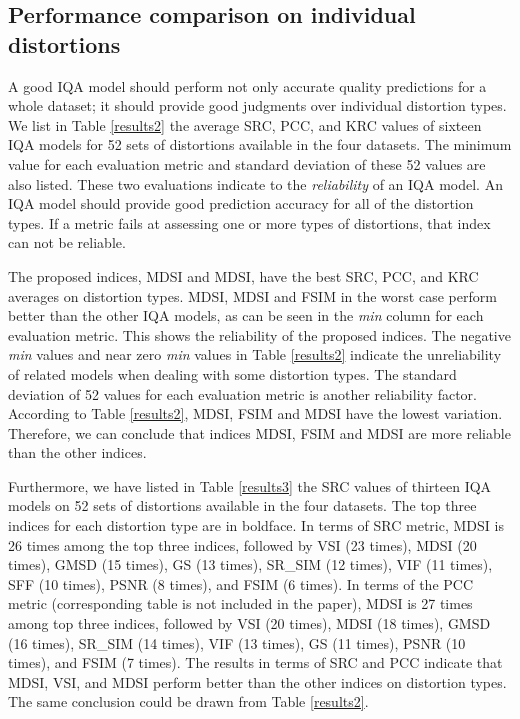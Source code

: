 \subsection{Performance comparison on individual distortions}
\label{individual}      

A good IQA model should perform not only accurate quality predictions for a whole dataset; it should provide good judgments over individual distortion types. We list in Table \ref{results2} the average SRC, PCC, and KRC values of sixteen IQA models for 52 sets of distortions available in the four datasets. The minimum value for each evaluation metric and standard deviation of these 52 values are also listed. These two evaluations indicate to the \textit{reliability} of an IQA model. An IQA model should provide good prediction accuracy for all of the distortion types. If a metric fails at assessing one or more types of distortions, that index can not be reliable.   

The proposed indices, MDSI and MDSI, have the best SRC, PCC, and KRC averages on distortion types. MDSI, MDSI and FSIM in the worst case perform better than the other IQA models, as can be seen in the \textit{min} column for each evaluation metric. This shows the reliability of the proposed indices. The negative \textit{min} values and near zero \textit{min} values in Table \ref{results2} indicate the unreliability of related models when dealing with some distortion types. The standard deviation of 52 values for each evaluation metric is another reliability factor. According to Table \ref{results2}, MDSI, FSIM and MDSI have the lowest variation. Therefore, we can conclude that indices MDSI, FSIM and MDSI are more reliable than the other indices.   

Furthermore, we have listed in Table \ref{results3} the SRC values of thirteen IQA models on 52 sets of distortions available in the four datasets. The top three indices for each distortion type are in boldface. In terms of SRC metric, MDSI is 26 times among the top three indices, followed by VSI (23 times), MDSI (20 times), GMSD (15 times), GS (13 times), SR\_SIM (12 times), VIF (11 times), SFF (10 times), PSNR (8 times), and FSIM (6 times). In terms of the PCC metric (corresponding table is not included in the paper), MDSI is 27 times among top three indices, followed by VSI (20 times), MDSI (18 times), GMSD (16 times), SR\_SIM (14 times), VIF (13 times), GS (11 times), PSNR (10 times), and FSIM (7 times). The results in terms of SRC and PCC indicate that MDSI, VSI, and MDSI perform better than the other indices on distortion types. The same conclusion could be drawn from Table \ref{results2}.       





